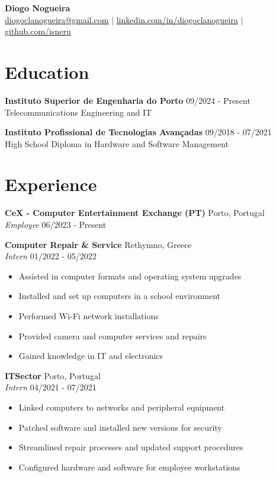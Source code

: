 \documentclass[letterpaper,10pt]{article}
\begin{document}
\begin{center}
    {\LARGE \textbf{Diogo Nogueira}}\\[4pt]
    \href{mailto:diogoclanogueira@gmail.com}{diogoclanogueira@gmail.com} \quad $|$ \quad 
    \href{https://www.linkedin.com/in/diogoclanogueira}{linkedin.com/in/diogoclanogueira} \quad $|$ \quad 
    \href{https://github.com/isneru}{github.com/isneru}
\end{center}

\vspace{0.3cm}

\section*{Education}

\textbf{Instituto Superior de Engenharia do Porto} \hfill 09/2024 - Present \\
Telecommunications Engineering and IT

\textbf{Instituto Profissional de Tecnologias Avançadas} \hfill 09/2018 - 07/2021 \\
High School Diploma in Hardware and Software Management

\section*{Experience}

\textbf{CeX - Computer Entertainment Exchange (PT)} \hfill Porto, Portugal \\
\textit{Employee} \hfill 06/2023 - Present

\bigskip

\textbf{Computer Repair \& Service} \hfill Rethymno, Greece \\
\textit{Intern} \hfill 01/2022 - 05/2022
\begin{itemize}[leftmargin=0.2in]
  \item Assisted in computer formats and operating system upgrades
  \item Installed and set up computers in a school environment
  \item Performed Wi-Fi network installations
  \item Provided camera and computer services and repairs
  \item Gained knowledge in IT and electronics
\end{itemize}

\bigskip

\textbf{ITSector} \hfill Porto, Portugal \\
\textit{Intern} \hfill 04/2021 - 07/2021
\begin{itemize}[leftmargin=0.2in]
  \item Linked computers to networks and peripheral equipment
  \item Patched software and installed new versions for security
  \item Streamlined repair processes and updated support procedures
  \item Configured hardware and software for employee workstations
\end{itemize}
\end{document}
